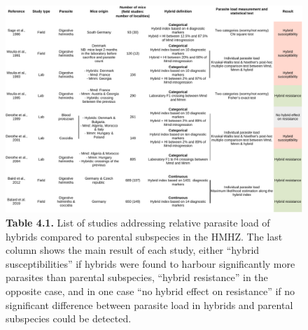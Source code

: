 \begin{figure}[H]
	\centering
	\includegraphics[width=\linewidth,height=\textheight,keepaspectratio]{images/4discussion/Table1.pdf}
	\captionsetup{labelformat=empty}
	\caption{\textbf{Table 4.1.} List of studies addressing relative parasite load of hybrids compared to parental subspecies in the HMHZ. The last column shows the main result of each study, either “hybrid susceptibilities” if hybrids were found to harbour significantly more parasites than parental subspecies, “hybrid resistance” in the opposite case, and in one case “no hybrid effect on resistance” if no significant difference between parasite load in hybrids and parental subspecies could be detected.}
\end{figure}
\addtocounter{figure}{-1}

